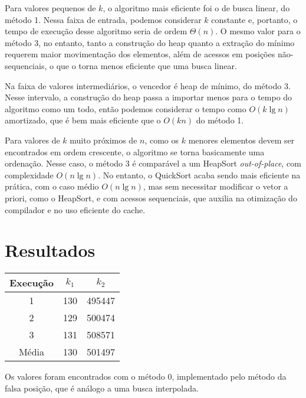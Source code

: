 Para valores pequenos de $k$, o algoritmo mais eficiente foi o de busca linear, do método 1. Nessa faixa de entrada, podemos considerar $k$ constante e, portanto, o tempo de execução desse algoritmo seria de ordem $\Theta(n)$. O mesmo valor para o método 3, no entanto, tanto a construção do heap quanto a extração do mínimo requerem maior movimentação dos elementos, além de acessos em posições não-sequenciais, o que o torna menos eficiente que uma busca linear.

Na faixa de valores intermediários, o vencedor é heap de mínimo, do método 3. Nesse intervalo, a construção do heap passa a importar menos para o tempo do algoritmo como um todo, então podemos considerar o tempo como $O(k \lg n)$ amortizado, que é bem mais eficiente que o $O(k n)$ do método 1.

Para valores de $k$ muito próximos de $n$, como os $k$ menores elementos devem ser encontrados em ordem crescente, o algoritmo se torna basicamente uma ordenação. Nesse caso, o método 3 é comparável a um HeapSort \textit{out-of-place}, com complexidade $O(n \lg n)$. No entanto, o QuickSort acaba sendo mais eficiente na prática, com o caso médio $O(n \lg n)$, mas sem necessitar modificar o vetor a priori, como o HeapSort, e com acessos sequenciais, que auxilia na otimização do compilador e no uso eficiente do cache.

\section{Resultados}

\begin{table}[H]
    \centering
    \begin{tabular}{ccc}
        \toprule
        Execução & $k_1$ & $k_2$ \\
        \midrule
        1 & 130 & 495447 \\
        2 & 129 & 500474 \\
        3 & 131 & 508571 \\
        \midrule
        Média & 130 & 501497 \\
        \bottomrule
    \end{tabular}
\end{table}

Os valores foram encontrados com o método 0, implementado pelo método da falsa posição, que é análogo a uma busca interpolada.
